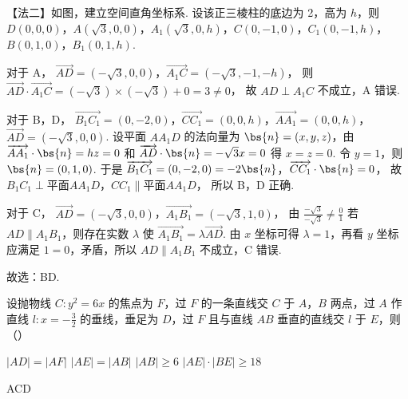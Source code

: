 \begin{solution}
【法二】如图，建立空间直角坐标系. 设该正三棱柱的底边为 2，高为 \(h\)，则
\(D(0,0,0)\)，\(A(\sqrt{3},0,0)\)，\(A_1(\sqrt{3},0,h)\)，\(C(0,-1,0)\)，\(C_1(0,-1,h)\)，\(B(0,1,0)\)，\(B_1(0,1,h)\).


对于 A，
\(\overrightarrow{AD} = (-\sqrt{3},0,0)\)，\(\overrightarrow{A_1C} = (-\sqrt{3},-1,-h)\)，
则
\(\overrightarrow{AD} \cdot \overrightarrow{A_1C} = (-\sqrt{3}) \times (-\sqrt{3}) + 0 = 3 \neq 0\)，
故 \(AD \perp A_1C\) 不成立，A 错误.

对于 B，D，
\(\overrightarrow{B_1C_1} = (0,-2,0)\)，\(\overrightarrow{CC_1} = (0,0,h)\)，\(\overrightarrow{AA_1} = (0,0,h)\)，\(\overrightarrow{AD} = (-\sqrt{3},0,0)\).
设平面 \(AA_1D\) 的法向量为 \(\bs{n} = (x,y,z)\)，由 \(\overrightarrow{AA_1} \cdot \bs{n} = hz = 0\) 和 \(\overrightarrow{AD} \cdot \bs{n} = -\sqrt{3}x = 0\) 得 \(x = z = 0\). 令 \(y = 1\)，则 \(\bs{n} = (0,1,0)\).
于是
\(\overrightarrow{B_1C_1} = (0,-2,0) = -2\bs{n}\)，\(\overrightarrow{CC_1} \cdot \bs{n} = 0\)，
故
\(B_1C_1 \perp \text{平面} AA_1D\)，\(CC_1 \parallel \text{平面} AA_1D\)，
所以 B，D 正确.

对于 C，
\(\overrightarrow{AD} = (-\sqrt{3},0,0)\)，\(\overrightarrow{A_1B_1} = (-\sqrt{3},1,0)\)，
由
\(\frac{-\sqrt{3}}{-\sqrt{3}} \neq \frac{0}{1}\)
若 \(AD \parallel A_1B_1\)，则存在实数 \(\lambda\) 使
\(\overrightarrow{A_1B_1}=\lambda \overrightarrow{AD}\).
由 \(x\) 坐标可得 \(\lambda=1\)，再看 \(y\) 坐标应满足 \(1=0\)，矛盾，所以 \(AD \parallel A_1B_1\) 不成立，C 错误.

故选：BD.
\end{solution}

\begin{problem}
设抛物线 \(C: y^2 = 6x\) 的焦点为 \(F\)，过 \(F\) 的一条直线交 \(C\) 于 \(A\)，\(B\) 两点，过 \(A\) 作直线 \(l: x = -\frac{3}{2}\) 的垂线，垂足为 \(D\)，过 \(F\) 且与直线 \(AB\) 垂直的直线交 \(l\) 于 \(E\)，则（\quad）

\choices
    {\(|AD| = |AF|\)}
    {\(|AE| = |AB|\)}
    {\(|AB| \ge 6\)}
    {\(|AE| \cdot |BE| \ge 18\)}
\end{problem}

\begin{answer}
ACD
\end{answer}


